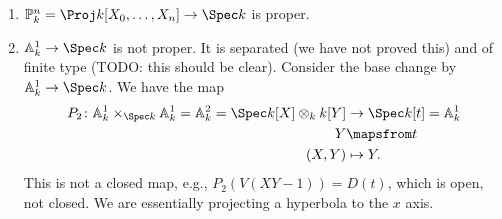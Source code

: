 \begin{enumerate}[label=(\arabic*)]
	\item  $\mathbb{P}_k^n = \Proj k[X_0, \ldots, X_n] \to \Spec k$ is proper.
	\item $\mathbb{A}_k^1\to \Spec k$ is not proper. It is separated (we have not proved
		this) and of finite type (TODO: this should be clear). Consider the base
		change by $\mathbb{A}_k^1\to \Spec k$. We have the map
		\begin{align*}
		P_2\colon	\mathbb{A}_k^1\times_{\Spec k} \mathbb{A}_k^1 = \mathbb{A}_k^2 = \Spec k[X] \otimes_k k[Y] &\to \Spec k[t]= \mathbb{A}_k^1\\
			Y &\mapsfrom t\\
			(X, Y)&\mapsto Y.
		\end{align*}
		This is not a closed map, e.g., $P_2(V(XY-1)) = D(t)$, which is open,
		not closed. We are essentially projecting a hyperbola to the $x$ axis.
\end{enumerate}
